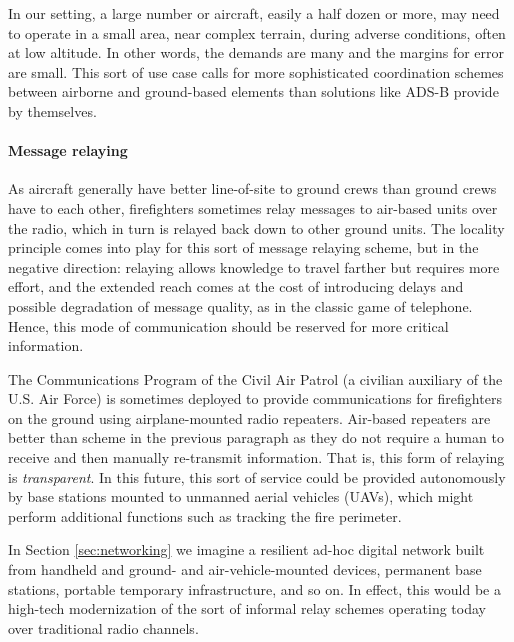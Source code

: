 \documentclass[]             %
{NASA}                       %
\theoremstyle{definition}
\begin{document}
In our setting, a large number or aircraft, easily a half dozen or
more, may need to operate in a small area, near complex terrain,
during adverse conditions, often at low altitude. In other words, the
demands are many and the margins for error are small. This sort of use
case calls for more sophisticated coordination schemes between
airborne and ground-based elements than solutions like ADS-B provide
by themselves.

\paragraph{Message relaying}
As aircraft generally have better line-of-site to ground crews than
ground crews have to each other, firefighters sometimes relay messages
to air-based units over the radio, which in turn is relayed back down
to other ground units. The locality principle comes into play for this
sort of message relaying scheme, but in the negative direction:
relaying allows knowledge to travel farther but requires more effort,
and the extended reach comes at the cost of introducing delays and
possible degradation of message quality, as in the classic game of
telephone. Hence, this mode of communication should be reserved for
more critical information.

The Communications Program of the Civil Air Patrol (a civilian
auxiliary of the U.S. Air Force) is sometimes deployed to provide
communications for firefighters on the ground using airplane-mounted
radio repeaters. Air-based repeaters are better than scheme in the
previous paragraph as they do not require a human to receive and then
manually re-transmit information. That is, this form of relaying is
\emph{transparent}. In this future, this sort of service could be
provided autonomously by base stations mounted to unmanned aerial
vehicles (UAVs), which might perform additional functions such as
tracking the fire perimeter.

In Section \ref{sec:networking} we imagine a resilient ad-hoc digital
network built from handheld and ground- and air-vehicle-mounted
devices, permanent base stations, portable temporary infrastructure,
and so on. In effect, this would be a high-tech modernization of the
sort of informal relay schemes operating today over traditional radio
channels.

\end{document}
